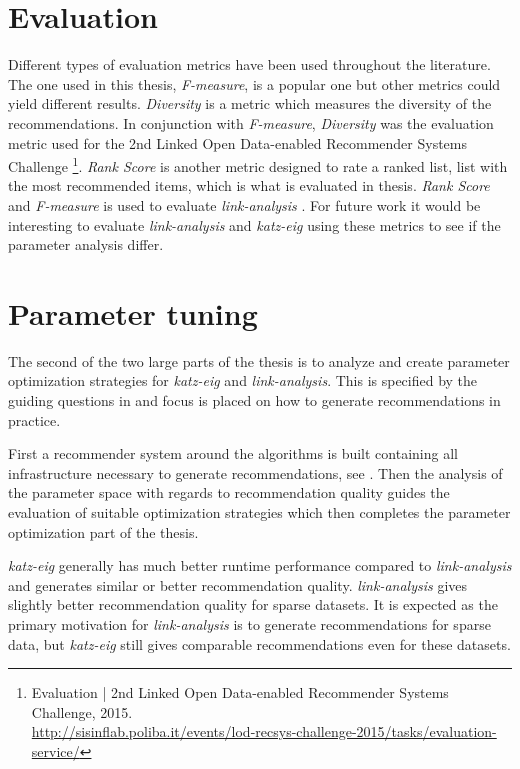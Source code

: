 \section{Evaluation}

Different types of evaluation metrics have been used throughout the literature. The one used in this thesis, \textit{F-measure}, is a popular one but other metrics could yield different results. \textit{Diversity} \citep{bobadilla2013recommender} is a metric which measures the diversity of the recommendations. In conjunction with \textit{F-measure}, \textit{Diversity} was the evaluation metric used for the 2nd Linked Open Data-enabled Recommender Systems Challenge
\footnote{
Evaluation | 2nd Linked Open Data-enabled Recommender Systems Challenge, 2015. \\
\url{http://sisinflab.poliba.it/events/lod-recsys-challenge-2015/tasks/evaluation-service/}
}.
\textit{Rank Score} \cite{huang2007comparison} is another metric designed to rate a ranked list, list with the most recommended items, which is what is evaluated in thesis. \textit{Rank Score} and \textit{F-measure} is used to evaluate \textit{link-analysis} \cite{huang2007comparison}. For future work it would be interesting to evaluate \textit{link-analysis} and \textit{katz-eig} using these metrics to see if the parameter analysis differ.


\section{Parameter tuning}

The second of the two large parts of the thesis is to analyze and create parameter optimization strategies for \textit{katz-eig} and \textit{link-analysis}. This is specified by the guiding questions in  and focus is placed on how to generate recommendations in practice.

First a recommender system around the algorithms is built containing all infrastructure necessary to generate recommendations, see . Then the analysis of the parameter space with regards to recommendation quality guides the evaluation of suitable optimization strategies which then completes the parameter optimization part of the thesis.

\textit{katz-eig} generally has much better runtime performance compared to \textit{link-analysis} and generates similar or better recommendation quality. \textit{link-analysis} gives slightly better recommendation quality for sparse datasets. It is expected as the primary motivation for \textit{link-analysis} is to generate recommendations for sparse data, but \textit{katz-eig} still gives comparable recommendations even for these datasets.

